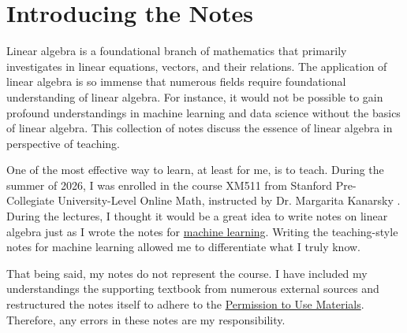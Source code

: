 \documentclass[../../../main.tex]{subfiles}
\begin{document}
\chapter*{Introducing the Notes}

Linear algebra is a foundational branch of mathematics that
primarily investigates in linear equations, vectors, and their
relations. The application of linear algebra is so immense that
numerous fields require foundational understanding of linear
algebra. For instance, it would not be possible to gain
profound understandings in machine learning and data science
without the basics of linear algebra. This collection of notes
discuss the essence of linear algebra in perspective of teaching.

One of the most effective way to learn, at least for me, is to
teach. During the summer of 2026, I was enrolled in the course
XM511 from Stanford Pre-Collegiate University-Level Online Math,
instructed by Dr. Margarita Kanarsky \cite{MATH02-1}. During the
lectures, I thought it would be a great idea to write notes on linear
algebra just as I wrote the notes for
\href{https://github.com/enochness/LibreNotebook}{machine learning}.
Writing the teaching-style notes for machine learning allowed
me to differentiate what I truly know.

That being said, my notes do not represent the course. I have
included my understandings the supporting textbook \cite{MATH02-2}
from numerous external sources and restructured the notes itself to
adhere to the \href{https://www.stanford.edu/site/terms/}{Permission
to Use Materials}. Therefore, any errors in these notes are my
responsibility.
\end{document}
